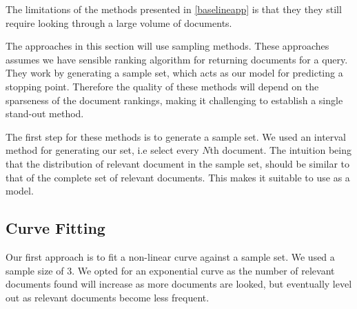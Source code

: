 The limitations of the methods presented in \ref{baselineapp} is that they they still require looking through a large volume of documents.

The approaches in this section will use sampling methods. These approaches assumes we have sensible ranking algorithm for returning documents for a query. They work by generating a sample set, which acts as our model for predicting a stopping point. Therefore the quality of these methods will depend on the sparseness of the document rankings, making it challenging to establish a single stand-out method.

The first step for these methods is to generate a sample set. We used an interval method for generating our set, i.e select every $N$th document. The intuition being that the distribution of relevant document in the sample set, should be similar to that of the complete set of relevant documents. This makes it suitable to use as a model. 

\subsection{Curve Fitting}

Our first approach is to fit a non-linear curve against a sample set. We used a sample size of 3. We opted for an exponential curve as the number of relevant documents found will increase as more documents are looked, but eventually level out as relevant documents become less frequent.  

